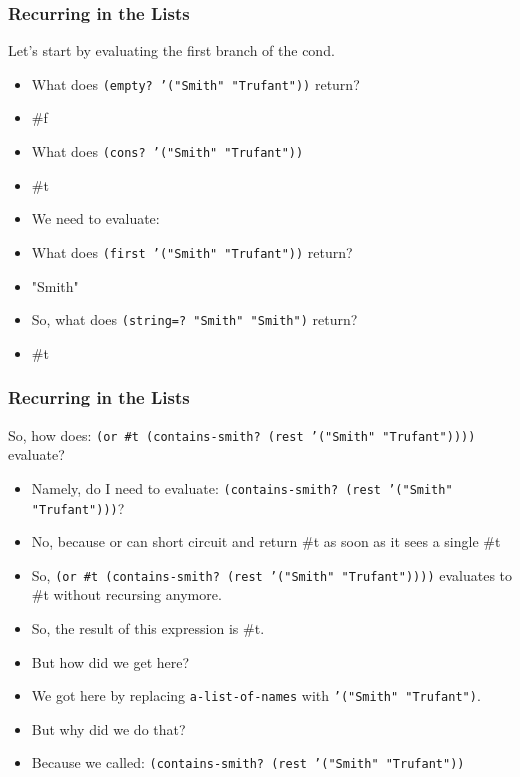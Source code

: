 \documentclass{beamer}
\begin{document}

\begin{frame}
  \frametitle{Recurring in the Lists}
  Let's start by evaluating the first branch of the cond.
  \begin{itemize}
  \item<2-> What does \texttt{(empty? '("Smith" "Trufant"))} return?
  \item<3-> \#f
  \item<4-> What does \texttt{(cons? '("Smith" "Trufant"))}
  \item<5-> \#t
  \item<6-> We need to evaluate:
    \ContainsElseRecur
  \item<7-> What does \texttt{(first '("Smith" "Trufant"))} return?
  \item<8-> "Smith"
  \item<9-> So, what does \texttt{(string=? "Smith" "Smith")} return?
  \item<10-> \#t
  \end{itemize}
\end{frame}

\begin{frame}
  \frametitle{Recurring in the Lists}
  So, how does: \texttt{(or \#t (contains-smith? (rest '("Smith" "Trufant"))))} evaluate?
  \begin{itemize}
  \item<2-> Namely, do I need to evaluate: \texttt{(contains-smith? (rest '("Smith" "Trufant")))}?
  \item<3-> No, because or can short circuit and return \#t as soon
    as it sees a single \#t
  \item<4-> So, \texttt{(or \#t (contains-smith? (rest '("Smith" "Trufant"))))} evaluates to
    \#t without recursing anymore.
  \item<5-> So, the result of this expression is \#t.
  \item<6-> But how did we get here?
  \item<7-> We got here by replacing \texttt{a-list-of-names} with \texttt{'("Smith" "Trufant")}.
  \item<8-> But why did we do that?
  \item<9-> Because we called:
    \texttt{(contains-smith? (rest '("Smith" "Trufant"))}
  \end{itemize}
\end{frame}
\end{document}
